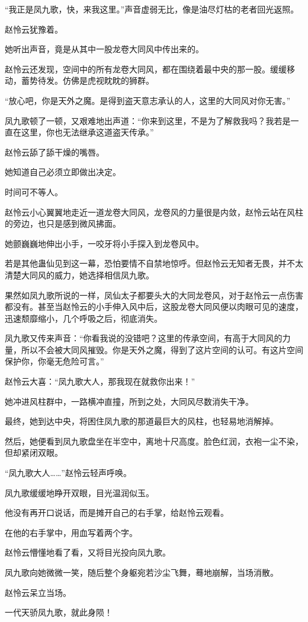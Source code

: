 \begin{this_body}
“我正是凤九歌，快，来我这里。”声音虚弱无比，像是油尽灯枯的老者回光返照。

赵怜云犹豫着。

她听出声音，竟是从其中一股龙卷大同风中传出来的。

赵怜云还发现，空间中的所有龙卷大同风，都在围绕着最中央的那一股。缓缓移动，蓄势待发。仿佛是虎视眈眈的狮群。

“放心吧，你是天外之魔。是得到盗天意志承认的人，这里的大同风对你无害。”

凤九歌顿了一顿，又艰难地出声道：“你来到这里，不是为了解救我吗？我若是一直在这里，你也无法继承这道盗天传承。”

赵怜云舔了舔干燥的嘴唇。

她知道自己必须立即做出决定。

时间可不等人。

赵怜云小心翼翼地走近一道龙卷大同风，龙卷风的力量很是内敛，赵怜云站在风柱的旁边，也只是感到微风拂面。

她颤巍巍地伸出小手，一咬牙将小手探入到龙卷风中。

若是其他蛊仙见到这一幕，恐怕要情不自禁地惊呼。但赵怜云无知者无畏，并不太清楚大同风的威力，她选择相信凤九歌。

果然如凤九歌所说的一样，凤仙太子都要头大的大同龙卷风，对于赵怜云一点伤害都没有。甚至当赵怜云的小手伸入风中后，这股龙卷大同风便以肉眼可见的速度，迅速颓靡缩小，几个呼吸之后，彻底消失。

凤九歌又传来声音：“你看我说的没错吧？这里的传承空间，有高于大同风的力量，所以不会被大同风摧毁。你是天外之魔，得到了这片空间的认可。有这片空间保护你，你毫无危险可言。”

赵怜云大喜：“凤九歌大人，那我现在就救你出来！”

她冲进风柱群中，一路横冲直撞，所到之处，大同风尽数消失干净。

最终，她到达中央，将困住凤九歌的那道最巨大的风柱，也轻易地消解掉。

然后，她便看到凤九歌盘坐在半空中，离地十尺高度。脸色红润，衣袍一尘不染，但却紧闭双眼。

“凤九歌大人……”赵怜云轻声呼唤。

凤九歌缓缓地睁开双眼，目光温润似玉。

他没有再开口说话，而是摊开自己的右手掌，给赵怜云观看。

在他的右手掌中，用血写着两个字。

赵怜云懵懂地看了看，又将目光投向凤九歌。

凤九歌向她微微一笑，随后整个身躯宛若沙尘飞舞，蓦地崩解，当场消散。

赵怜云呆立当场。

一代天骄凤九歌，就此身陨！

\end{this_body}

